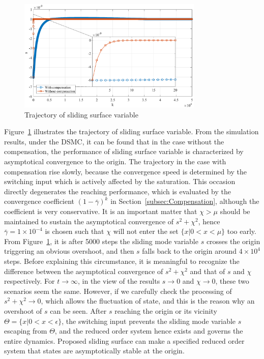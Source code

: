 \documentclass[10pt,onecolumn,draftcls]{IEEEtran}
\begin{document}
\begin{figure}[htbp] 
\centering
\includegraphics[width=250pt]{slidingsurface.eps}
\caption{Trajectory of sliding surface variable} \label{fig:graph_s}
\end{figure} 

Figure~\ref{fig:graph_s} illustrates the trajectory of sliding surface variable. From the simulation results, under the DSMC, it can be found that in the case without the compensation, the performance of sliding surface variable is characterized by asymptotical convergence to the origin. The trajectory in the case with compensation rise slowly, because the convergence speed is determined by the switching input which is actively affected by the saturation. This occasion directly degenerates the reaching performance, which is evaluated by the convergence coefficient $(1-\bar\gamma)^k$ in Section~\ref{subsec:Compensation}, although the coefficient is very conservative. It is an important matter that $\chi>\mu$ should be maintained to sustain the asymptotical convergence of $s^2+\chi^2$, hence $\bar\gamma = 1\times 10^{-4}$ is chosen such that $\chi$ will not enter the set $\{x\vert 0<x<\mu\}$ too early. From Figure~\ref{fig:graph_s}, it is after 5000 steps the sliding mode variable $s$ crosses the origin triggering an obvious overshoot, and then $s$ falls back to the origin around $4\times 10^4$ steps. Before explaining this circumstance, it is meaningful to recognize the difference between the asymptotical convergence of $s^2+\chi^2$ and that of $s$ and $\chi$ respectively. For $t\to\infty$, in the view of the results $s\to 0$ and $\chi\to 0$, these two scenarios seem the same. However, if we carefully check the processing of $s^2+\chi^2\to 0$, which allows the fluctuation of state, and this is the reason why an overshoot of $s$ can be seen.  After $s$ reaching the origin or its vicinity $\Theta=\{x\vert 0<x<\epsilon\}$,  the switching input prevents the sliding mode variable $s$ escaping from $\Theta$, and the reduced order  system hence exists and governs the entire dynamics. Proposed sliding surface can make a specified reduced order  system that states are asymptotically stable at the origin.  
\end{document}
